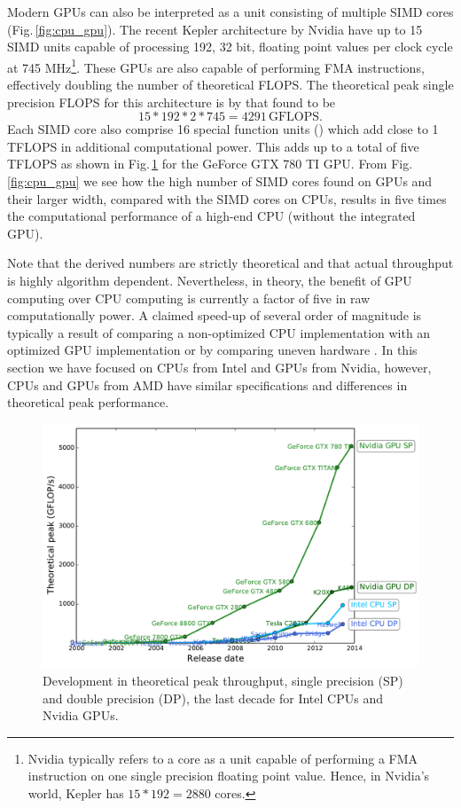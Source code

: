 Modern GPUs can also be interpreted as a unit consisting of multiple SIMD cores (Fig.\,\ref{fig:cpu_gpu}). The recent Kepler architecture by Nvidia have up to 15 SIMD units capable of processing 192, 32 bit, floating point values per clock cycle at 745 MHz\footnote{Nvidia typically refers to a core as a unit capable of performing a FMA instruction on one single precision floating point value. Hence, in Nvidia's world, Kepler has $15*192=2880$ cores.}. These GPUs are also capable of performing FMA instructions, effectively doubling the number of theoretical FLOPS. The theoretical peak single precision FLOPS for this architecture is by that found to be 
\begin{equation}
15*192*2*745 = 4291\,\text{GFLOPS}.
\end{equation} 
Each SIMD core also comprise 16 special function units () which add close to 1 TFLOPS in additional computational power. This adds up to a total of five TFLOPS as shown in Fig.\,\ref{fig:cpu_vs_gpu} for the GeForce GTX 780 TI GPU. From Fig.\,\ref{fig:cpu_gpu} we see how the high number of SIMD cores found on GPUs and their larger width, compared with the SIMD cores on CPUs, results in five times the computational performance of a high-end CPU (without the integrated GPU). 

Note that the derived numbers are strictly theoretical and that actual throughput is highly algorithm dependent. Nevertheless, in theory, the benefit of GPU computing over CPU computing is currently a factor of five in raw computationally power. A claimed speed-up of several order of magnitude is typically a result of comparing a non-optimized CPU implementation with an optimized GPU implementation or by comparing uneven hardware \cite{Lee2010, Kothapalli2013}. In this section we have focused on CPUs from Intel and GPUs from Nvidia, however, CPUs and GPUs from AMD have similar specifications and differences in theoretical peak performance. 

\begin{figure}
\centering
\includegraphics[width=\textwidth]{img/cpu_vs_gpu.pdf}
\caption{Development in theoretical peak throughput, single precision (SP) and double precision (DP), the last decade for Intel CPUs and Nvidia GPUs.}
\label{fig:cpu_vs_gpu}
\end{figure}

